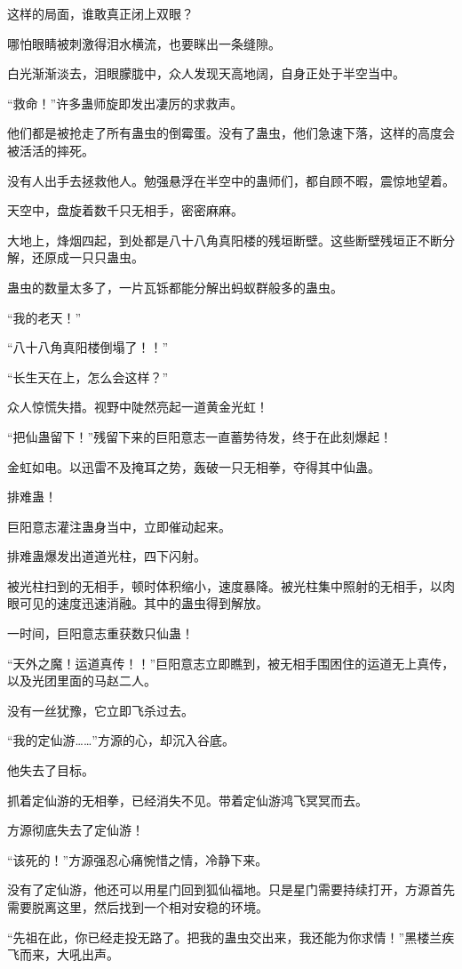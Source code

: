 \begin{this_body}
这样的局面，谁敢真正闭上双眼？

哪怕眼睛被刺激得泪水横流，也要眯出一条缝隙。

白光渐渐淡去，泪眼朦胧中，众人发现天高地阔，自身正处于半空当中。

“救命！”许多蛊师旋即发出凄厉的求救声。

他们都是被抢走了所有蛊虫的倒霉蛋。没有了蛊虫，他们急速下落，这样的高度会被活活的摔死。

没有人出手去拯救他人。勉强悬浮在半空中的蛊师们，都自顾不暇，震惊地望着。

天空中，盘旋着数千只无相手，密密麻麻。

大地上，烽烟四起，到处都是八十八角真阳楼的残垣断壁。这些断壁残垣正不断分解，还原成一只只蛊虫。

蛊虫的数量太多了，一片瓦铄都能分解出蚂蚁群般多的蛊虫。

“我的老天！”

“八十八角真阳楼倒塌了！！”

“长生天在上，怎么会这样？”

众人惊慌失措。视野中陡然亮起一道黄金光虹！

“把仙蛊留下！”残留下来的巨阳意志一直蓄势待发，终于在此刻爆起！

金虹如电。以迅雷不及掩耳之势，轰破一只无相拳，夺得其中仙蛊。

排难蛊！

巨阳意志灌注蛊身当中，立即催动起来。

排难蛊爆发出道道光柱，四下闪射。

被光柱扫到的无相手，顿时体积缩小，速度暴降。被光柱集中照射的无相手，以肉眼可见的速度迅速消融。其中的蛊虫得到解放。

一时间，巨阳意志重获数只仙蛊！

“天外之魔！运道真传！！”巨阳意志立即瞧到，被无相手围困住的运道无上真传，以及光团里面的马赵二人。

没有一丝犹豫，它立即飞杀过去。

“我的定仙游……”方源的心，却沉入谷底。

他失去了目标。

抓着定仙游的无相拳，已经消失不见。带着定仙游鸿飞冥冥而去。

方源彻底失去了定仙游！

“该死的！”方源强忍心痛惋惜之情，冷静下来。

没有了定仙游，他还可以用星门回到狐仙福地。只是星门需要持续打开，方源首先需要脱离这里，然后找到一个相对安稳的环境。

“先祖在此，你已经走投无路了。把我的蛊虫交出来，我还能为你求情！”黑楼兰疾飞而来，大吼出声。


\end{this_body}
